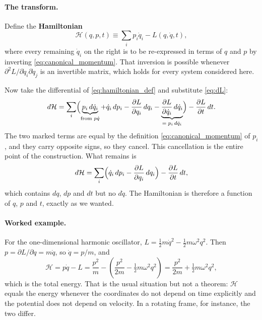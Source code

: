 \documentclass[12pt]{article}
\newcommand{\Ham}{\mathcal{H}}
\begin{document}
\paragraph{The transform.}  Define the \textbf{Hamiltonian}
%
\begin{equation}
  \Ham(q,p,t) \equiv \sum_i p_i\dot q_i - L(q,\dot q,t) ,
  \label{eq:hamiltonian_def}
\end{equation}
%
where every remaining $\dot q_i$ on the right is to be re-expressed in
terms of $q$ and $p$ by inverting \eqref{eq:canonical_momentum}.  That
inversion is possible whenever $\partial^2 L/\partial\dot q_i\partial\dot q_j$
is an invertible matrix, which holds for every system considered here.

Now take the differential of \eqref{eq:hamiltonian_def} and substitute
\eqref{eq:dL}:
%
\begin{equation}
  d\Ham = \sum_i\Bigl(
     \underbrace{p_i\,d\dot q_i}_{\text{from } p\dot q}
   + \dot q_i\,dp_i
   - \frac{\partial L}{\partial q_i}\,dq_i
   - \underbrace{\frac{\partial L}{\partial\dot q_i}\,d\dot q_i}_{= \; p_i\,d\dot q_i}
     \Bigr)
   - \frac{\partial L}{\partial t}\,dt .
  \label{eq:dH_cancellation}
\end{equation}
%
The two marked terms are equal by the definition
\eqref{eq:canonical_momentum} of $p_i$, and they carry opposite signs,
so they cancel.  This cancellation is the entire point of the
construction.  What remains is
%
\begin{equation}
  d\Ham = \sum_i\Bigl(\dot q_i\,dp_i
        - \frac{\partial L}{\partial q_i}\,dq_i\Bigr)
        - \frac{\partial L}{\partial t}\,dt ,
  \label{eq:dH}
\end{equation}
%
which contains $dq$, $dp$ and $dt$ but no $d\dot q$.  The Hamiltonian
is therefore a function of $q$, $p$ and $t$, exactly as we wanted.

\paragraph{Worked example.}  For the one-dimensional harmonic
oscillator, $L = \tfrac12 m\dot q^2 - \tfrac12 m\omega^2 q^2$.  Then
$p = \partial L/\partial\dot q = m\dot q$, so $\dot q = p/m$, and
%
\begin{equation}
  \Ham = p\dot q - L
       = \frac{p^2}{m} - \left(\frac{p^2}{2m}
         - \tfrac12 m\omega^2 q^2\right)
       = \frac{p^2}{2m} + \tfrac12 m\omega^2 q^2 ,
  \label{eq:sho_hamiltonian}
\end{equation}
%
which is the total energy.  That is the usual situation but not a
theorem: $\Ham$ equals the energy whenever the coordinates do not
depend on time explicitly and the potential does not depend on
velocity.  In a rotating frame, for instance, the two differ.
\end{document}
